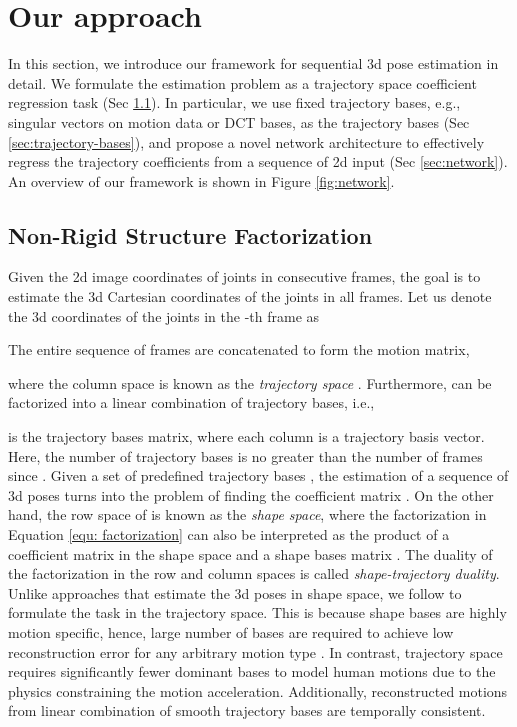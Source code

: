 \documentclass{bmvc2k}
\begin{document}
\section{Our approach}
\label{sec:approach}

In this section, we introduce our framework for sequential 3d pose estimation in detail. We formulate the estimation problem as a trajectory space coefficient regression task (Sec \ref{sec:factorization}). In particular, we use fixed trajectory bases, e.g., singular vectors on motion data or DCT bases, as the trajectory bases (Sec \ref{sec:trajectory-bases}), and propose a novel network architecture to effectively regress the trajectory coefficients from a sequence of 2d input (Sec \ref{sec:network}). An overview of our framework is shown in Figure \ref{fig:network}.

\subsection{Non-Rigid Structure Factorization}
\label{sec:factorization}

Given the 2d image coordinates  of  joints in  consecutive frames, the goal is to estimate the 3d Cartesian coordinates  of the  joints in all  frames. Let us denote the 3d coordinates of the  joints in the -th frame as

The entire sequence of  frames are concatenated to form the motion matrix,

where the column space is known as the \textit{trajectory space} \cite{akhter2009nonrigid}. Furthermore,  can be factorized into a linear combination of  trajectory bases, i.e., 

 is the trajectory bases matrix, where each column  is a trajectory basis vector.
Here, the number of trajectory bases  is no greater than the number of frames  since . Given a set of predefined trajectory bases , the estimation of a sequence of 3d poses  turns into the problem of finding the coefficient matrix .
On the other hand, the row space of  is known as the \textit{shape space}, where
the factorization in Equation \ref{equ: factorization} can also be interpreted as the product of a coefficient matrix  in the shape space and a shape bases matrix . The duality of the factorization in the row and column spaces is called \textit{shape-trajectory duality}. 
Unlike approaches \cite{ramakrishna2012reconstructing, zhou20153d, zhou2016sparseness} that estimate the 3d poses in shape space, we follow \cite{akhter2009nonrigid} to formulate the task in the trajectory space. This is because shape bases are highly motion specific, hence, large number of bases are required to achieve low reconstruction error for any arbitrary motion type \cite{ramakrishna2012reconstructing}. In contrast, trajectory space requires significantly fewer dominant bases to model human motions due to the physics constraining the motion acceleration. Additionally, reconstructed motions from linear combination of smooth trajectory bases are temporally consistent.
\end{document}
